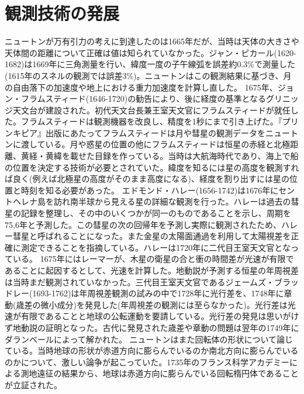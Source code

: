 \section{観測技術の発展}
	ニュートンが万有引力の考えに到達したのは1665年だが、当時は天体の大きさや天体間の距離について正確は値は知られていなかった。ジャン・ピカール(1620-1682)は1669年に三角測量を行い、緯度一度の子午線弧を誤差約0.3\%で測量した(1615年のスネルの観測では誤差3\%)。ニュートンはこの観測結果に基づき、月の自由落下の加速度や地上における重力加速度を計算し直した。
	1675年、ジョン・フラムスティード(1646-1720)の勧告により、後に経度の基準となるグリニッジ天文台が建設された。初代天文台長兼王室天文官にフラムスティードが就任した。フラムスティードは観測機器を改良し、精度を1秒にまで引き上げた。『プリンキピア』出版にあたってフラムスティードは月や彗星の観測データをニュートンに渡している。月や惑星の位置の他にフラムスティードは恒星の赤経と北極距離、黄経・黄緯を載せた目録を作っている。当時は大航海時代であり、海上で船の位置を決定する技術が必要とされていた。緯度を知るには星の高度を観測すれば良く(例えば北極星の高度がそのまま高度になる)、経度を割り出すには星の位置と時刻を知る必要があった。
	エドモンド・ハレー(1656-1742)は1676年にセントヘレナ島を訪れ南半球から見える星の詳細な観測を行った。ハレーは過去の彗星の記録を整理し、その中のいくつかが同一のものであることを示し、周期を75,6年と予測した。この彗星の次の回帰年を予測し実際に観測されたため、ハレー彗星と呼ばれることになった。また金星の太陽面通過を利用して太陽視差を正確に測定できることを指摘している。ハレーは1720年に二代目王室天文官となっている。
	1675年にはレーマーが、木星の衛星の合と衝の時間差が光速が有限であることに起因するとして、光速を計算した。地動説が予測する恒星の年周視差は当時まだ観測されていなかった。三代目王室天文官であるジェームズ・ブラッドレー(1693-1762)は年周視差観測の試みの中で1728年に光行差を、1748年に章動(歳差の微小成分)を発見した(年周視差の観測には至らなかった)。光行差は光速が有限であることと地球の公転運動を要請している。光行差の発見は思いがけず地動説の証明となった。古代に発見された歳差や章動の問題は翌年の1749年にダランベールによって解かれた。
	ニュートンはまた回転体の形状について論じている。当時地球の形状が赤道方向に膨らんでいるのか南北方向に膨らんでいるのかについて、激しい論争が起こっていた。1735年のフランス科学アカデミーによる測地遠征の結果から、地球は赤道方向に膨らんでいる回転楕円体であることが立証された。
